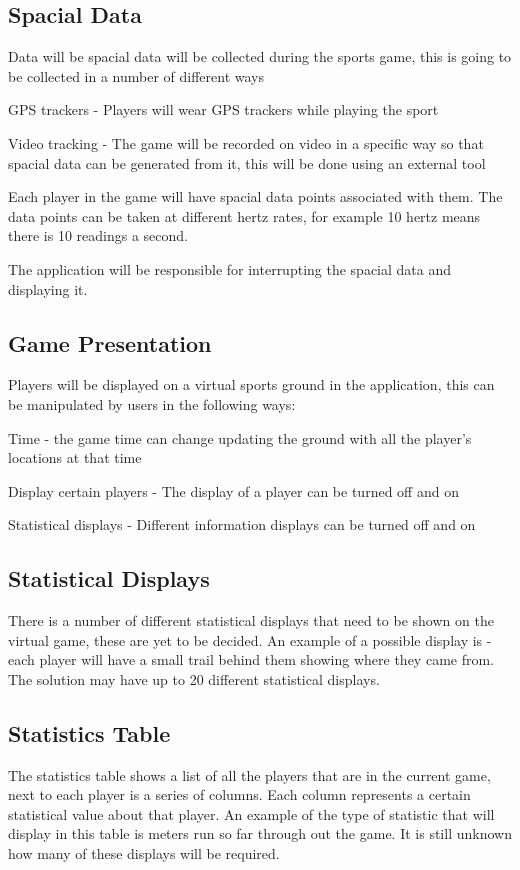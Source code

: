 \documentclass[12pt]{article}
\begin{document}
	\subsection{Spacial Data}
	Data will be spacial data will be collected during the sports game, this is going to be collected in a number of different ways
	\begin{list}{}{}
		\item GPS trackers - Players will wear GPS trackers while playing the sport
		\item Video tracking - The game will be recorded on video in a specific way so that spacial data can be generated from it, this will be done using an external tool
	\end{list} 
	
	Each player in the game will have spacial data points associated with them.
	The data points can be taken at different hertz rates, for example 10 hertz means there is 10 readings a second.
	
	The application will be responsible for interrupting the spacial data and displaying it.
	
	\subsection{Game Presentation}
	Players will be displayed on a virtual sports ground in the application, this can be manipulated by users in the following ways:
	
	\begin{list}{}{}
		\item Time - the game time can change updating the ground with all the player's locations at that time
		\item Display certain players - The display of a player can be turned off and on
		\item Statistical displays - Different information displays can be turned off and on
	\end{list}
	
	
	\subsection{Statistical Displays}
	There is a number of different statistical displays that need to be shown on the virtual game, these are yet to be decided.
	An example of a possible display is - each player will have a small trail behind them showing where they came from.
	The solution may have up to 20 different statistical displays.
	
	\subsection{Statistics Table}
	The statistics table shows a list of all the players that are in the current game, next to each player is a series of columns.
	Each column represents a certain statistical value about that player.
	An example of the type of statistic that will display in this table is meters run so far through out the game.
	It is still unknown how many of these displays will be required.
	
\end{document}
